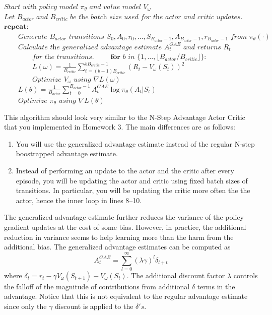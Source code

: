 \documentclass[12pt]{article}
\begin{document}
\begin{algorithm}
\label{alga2c}
\caption{Actor-Critic with Generalized Advantage Estimation\label{a2c}}
\begin{algorithmic}[1]
\State $\textit{Start with policy model } \pi_\theta \textit{ and value model } V_\omega$
\State $\textit{Let } B_{actor} \textit{ and } B_{critic} \textit{ be the batch size used for the actor and critic updates.}$
\State $\textbf{repeat:}$
\State $\qquad\textit{Generate } B_{actor} \textit{ transitions } S_0, A_0, r_0, \ldots, S_{B_{actor}-1}, A_{B_{actor}-1}, r_{B_{actor}-1} \textit{ from } \pi_\theta(\cdot)$
\State $\qquad\textit{Calculate the generalized advantage estimate } A_t^{GAE} \textit{ and returns } R_t $
\State $\qquad\qquad\textit{for the transitions.}$
\State $\qquad\textbf{for } b \textit{ in } \{1,\ldots, \lfloor B_{actor}/B_{critic}\rfloor\}$:
\State $\qquad\qquad L(\omega) = \frac{1}{B_{critic}} \sum_{t=(b-1)B_{critic}}^{bB_{critic}-1} (R_t - V_\omega(S_t))^2$
\State $\qquad\qquad\textit{Optimize } V_\omega \textit{ using } \nabla L(\omega)$
\State $\qquad L(\theta) = \frac{1}{B_{actor}} \sum_{t=0}^{B_{actor}-1} A_t^{GAE} \log \pi_\theta(A_t | S_t)$
\State $\qquad\textit{Optimize } \pi_\theta \textit{ using } \nabla L(\theta)$

\EndProcedure
\end{algorithmic}
\end{algorithm}
This algorithm should look very similar to the N-Step Advantage Actor Critic that you implemented in Homework 3.  The main differences are as follows:
\begin{enumerate}
    \item You will use the generalized advantage estimate instead of the regular N-step boostrapped advantage estimate.  
    \item Instead of performing an update to the actor and the critic after every episode, you will be updating the actor and critic using fixed batch sizes of transitions.  In particular, you will be updating the critic more often the the actor, hence the inner loop in lines 8--10.  
\end{enumerate}

The generalized advantage estimate \cite{schulman2015high} further reduces the variance of the policy gradient updates at the cost of some bias.  However, in practice, the additional reduction in variance seems to help learning more than the harm from the additional bias.  The generalized advantage estimates can be computed as 
\[A_t^{GAE} = \sum_{l=0}^\infty (\lambda\gamma)^l\delta_{l+t}\]
where $\delta_{t} = r_t-\gamma V_\omega(S_{t+1}) - V_\omega(S_t)$.  The additional discount factor $\lambda$ controls the falloff of the magnitude of contributions from additional $\delta$ terms in the advantage.  Notice that this is not equivalent to the regular advantage estimate since only the $\gamma$ discount is applied to the $\delta's$.  
\end{document}
